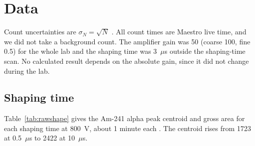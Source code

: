 \documentclass[12pt]{article}
\begin{document}


%

\section{Data}
\label{sec:data}

Count uncertainties are $\sigma_N = \sqrt{N}$ \cite{knoll}. All count times are Maestro live time, and we did not take a background count. The amplifier gain was 50 (coarse 100, fine 0.5) for the whole lab and the shaping time was 3~$\mu$s outside the shaping-time scan. No calculated result depends on the absolute gain, since it did not change during the lab.

\subsection{Shaping time}

Table~\ref{tab:rawshape} gives the Am-241 alpha peak centroid and gross area for each shaping time at 800~V, about 1 minute each \cite{labmanual}. The centroid rises from 1723 at 0.5~$\mu$s to 2422 at 10~$\mu$s.
\end{document}
